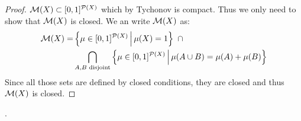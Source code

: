     \begin{proof}
        $\mathcal{M}(X) \subset [0, 1]^{\mathcal{P}(X)}$ which by Tychonov is compact.
        Thus we only need to show that $\mathcal{M}(X)$ is closed.
        We an write $\mathcal{M}(X)$ as:
        \begin{align*}
            \mathcal{M}(X) =&
            \left\{ 
                \mu \in [0, 1]^{\mathcal{P}(X)}
             \, \middle| \, 
                \mu(X) = 1
             \right\}
            ~\cap \\&
            \bigcap_{A, B \text{ disjoint}}
            \left\{ 
                \mu \in [0, 1]^{\mathcal{P}(X)}
             \, \middle| \, 
                \mu(A \cup B) = \mu(A) + \mu(B)
             \right\}
        \end{align*}
        Since all those sets are defined by closed conditions, 
        they are closed and thus $\mathcal{M}(X)$ is closed.
    \end{proof}



    \newpage
    .

